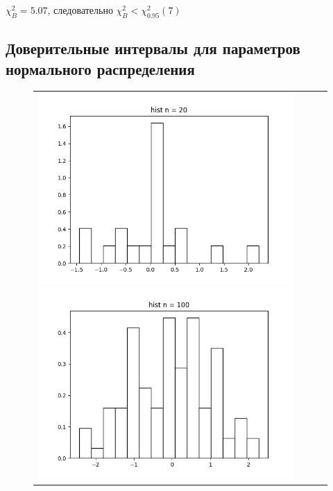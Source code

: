 $\chi_{B}^2 = 5.07$, следовательно  $\chi_{B}^2 <\chi^{2}_{0.95}(7)$ \\

\subsection{Доверительные интервалы для параметров нормального распределения}

\begin{figure}[H]
	\begin{tabular}{cccc}
		\includegraphics[scale=0.3]{hist_n_20.png}
		\includegraphics[scale=0.3]{hist_n_100.png}

\end{tabular}
\end{figure}
